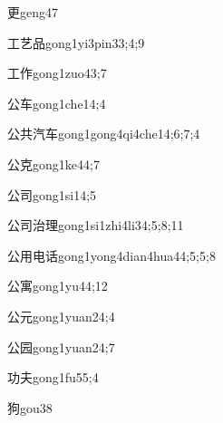 \begin{verbete}{更}{geng4}{7}
\end{verbete}
\begin{verbete}{工艺品}{gong1yi3pin3}{3;4;9}
\end{verbete}
\begin{verbete}{工作}{gong1zuo4}{3;7}
\end{verbete}
\begin{verbete}{公车}{gong1che1}{4;4}
\end{verbete}
\begin{verbete}{公共汽车}{gong1gong4qi4che1}{4;6;7;4}
\end{verbete}
\begin{verbete}{公克}{gong1ke4}{4;7}
\end{verbete}
\begin{verbete}{公司}{gong1si1}{4;5}
\end{verbete}
\begin{verbete}{公司治理}{gong1si1zhi4li3}{4;5;8;11}
\end{verbete}
\begin{verbete}{公用电话}{gong1yong4dian4hua4}{4;5;5;8}
\end{verbete}
\begin{verbete}{公寓}{gong1yu4}{4;12}
\end{verbete}
\begin{verbete}{公元}{gong1yuan2}{4;4}
\end{verbete}
\begin{verbete}{公园}{gong1yuan2}{4;7}
\end{verbete}
\begin{verbete}{功夫}{gong1fu5}{5;4}
\end{verbete}
\begin{verbete}{狗}{gou3}{8}
\end{verbete}
